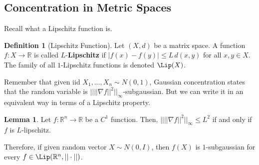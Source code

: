 \documentclass{article}
\theoremstyle{definition}
\newtheorem{lemma}[theorem]{Lemma}
\theoremstyle{remark}
\theoremstyle{definition}
\newtheorem{definition}{Definition}[section]
\begin{document}
  \subsection{Concentration in Metric Spaces}

  Recall what a Lipschitz function is. 

  \begin{definition}[Lipschitz Function]
  Let $(X, d)$ be a matrix space. A function $f: X \rightarrow \mathbb{R}$ is called $L$-\textbf{Lipschitz} if $|f(x) - f(y)| \leq L \, d(x, y)$ for all $x, y \in X$. The family of all $1$-Lipschitz functions is denoted $\Lip(X)$. 
  \end{definition}

  Remember that given iid $X_1, \ldots, X_n \sim N(0, 1)$, Gaussian concentration states that the random variable is $|| ||\nabla f||^2 ||_\infty$-subgaussian. But we can write it in an equivalent way in terms of a Lipschitz property. 

  \begin{lemma}
  Let $f: \mathbb{R}^n \rightarrow \mathbb{R}$ be a $C^1$ function. Then, $|| ||\nabla f||^2 ||_\infty \leq L^2$ if and only if $f$ is $L$-lipschitz. 
  \end{lemma}

  Therefore, if given random vector $X \sim N(0, I)$, then $f(X)$ is $1$-subgaussian for every $f \in \Lip(\mathbb{R}^n, ||\cdot||)$. 
\end{document}
